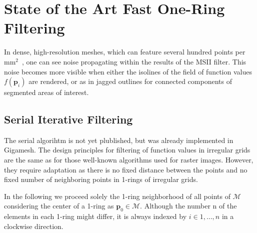 \documentclass[openany]{book}
\newcommand{\bp}{\mathbf{p}}
\begin{document}
\chapter{State of the Art Fast One-Ring Filtering}
In dense, high-resolution meshes, which can feature several hundred points per
mm$^2$~\cite[p.~00]{SourceNeeded}, one can see noise propagating within the 
results of the MSII filter. This noise becomes more visible when either the 
isolines of the field of function values $f(\bp_i)$ are rendered, or as
in jagged outlines for connected components of segmented areas of interest.
~\cite[s.~3.2]{Mara17}



\section{Serial Iterative Filtering}
The serial algorihtm is not yet plublished, but was already implemented in Gigamesh.
The design principles for filtering of function 
values in irregular grids are the same as for those well-known algorithms used 
for raster images. However, they require adaptation as there is no fixed 
distance between the points and no fixed number of neighboring points in 
1-rings of irregular grids.

In the following we proceed solely the 1-ring neighborhood of all points of 
$\mathcal{M}$ considering the center of a 1-ring as $\bp_0 \in 
\mathcal{M}$. Although the number n of the elements in each 1-ring might 
differ, it is always indexed by $i \in {1, \ldots, n}$ in a clockwise
direction. %
\end{document}
